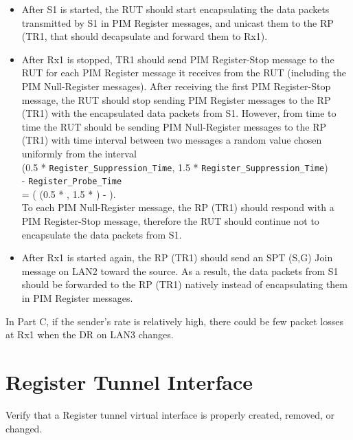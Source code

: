 \documentclass[11pt]{report}
\begin{document}
\begin{itemize}

  \item After S1 is started, the RUT should start
  encapsulating the data packets transmitted by S1 in PIM Register messages,
  and unicast them to the RP (TR1, that should decapsulate and forward them to
  Rx1).

  \item After Rx1 is stopped, TR1 should send PIM Register-Stop message to
  the RUT for each PIM Register message it receives from the RUT (including
  the PIM Null-Register messages). After receiving the first PIM Register-Stop
  message, the RUT should stop sending PIM Register messages to the RP (TR1)
  with the encapsulated data packets from S1.
  However, from time to time the RUT should be sending PIM Null-Register
  messages to the RP (TR1) with time interval between two messages a random
  value chosen uniformly from the interval \\
  (0.5 * \verb=Register_Suppression_Time=,
  1.5 * \verb=Register_Suppression_Time=) \\
  - \verb=Register_Probe_Time= \\
  = ( (0.5 * {\PimsmRegisterSuppressionTime}, 1.5 *
  {\PimsmRegisterSuppressionTime}) - {\PimsmRegisterProbeTime} ). \\
  To each PIM Null-Register message, the RP (TR1) should respond with a PIM
  Register-Stop message, therefore the RUT should continue not to encapsulate
  the data packets from S1.

  \item After Rx1 is started again, the RP (TR1) should send an SPT (S,G) Join
  message on LAN2 toward the source. As a result, the data packets from S1
  should be forwarded to the RP (TR1) natively instead of encapsulating them
  in PIM Register messages.

\end{itemize}


In Part C, if the sender's rate is relatively high, there could be few packet
losses at Rx1 when the DR on LAN3 changes.

\newpage
\section{Register Tunnel Interface}

Verify that a Register tunnel virtual interface is properly created, removed,
or changed.
\end{document}
